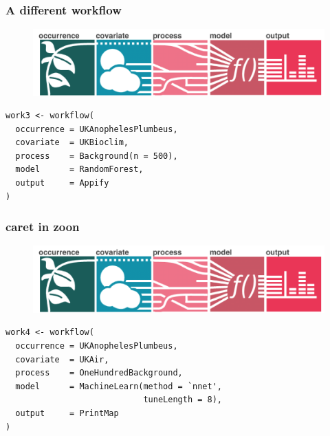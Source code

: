 \documentclass{beamer}
\begin{document}
\begin{frame}[fragile]
\frametitle{A different workflow}
\begin{figure}
    \includegraphics[width = \textwidth]{diagrams}
\end{figure} 
\renewcommand{\FancyVerbFormatLine}[1]{%
   \ifnum\value{FancyVerbLine}=3\color{cyan}#1%
   \else%
   \ifnum\value{FancyVerbLine}=6\color{cyan}#1%
   \else #1\fi\fi}

\begin{Verbatim}
work3 <- workflow(
  occurrence = UKAnophelesPlumbeus,
  covariate  = UKBioclim,
  process    = Background(n = 500),
  model      = RandomForest,
  output     = Appify
)

\end{Verbatim}

\end{frame} 


\begin{frame}[fragile]
\frametitle{caret in zoon}
\begin{figure}
    \includegraphics[width = \textwidth]{diagrams}
\end{figure} 
\renewcommand{\FancyVerbFormatLine}[1]{%
   \ifnum\value{FancyVerbLine}=5\color{cyan}#1%
   \else%
   \ifnum\value{FancyVerbLine}=6\color{cyan}#1%
   \else #1\fi\fi}
\begin{Verbatim}
work4 <- workflow(
  occurrence = UKAnophelesPlumbeus,
  covariate  = UKAir,
  process    = OneHundredBackground,
  model      = MachineLearn(method = `nnet', 
                            tuneLength = 8),
  output     = PrintMap
)
\end{Verbatim}

\end{frame} 
\end{document}
